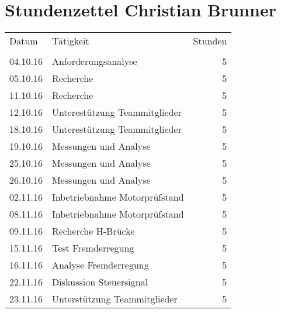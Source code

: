 \chapter{Stundenzettel Christian Brunner}
\begin{minipage}{0.5\textwidth}
    \begin{tabular}{lp{4.5cm}r}
		Datum		&	Tätigkeit				&Stunden	\\
					&							&			\\
		04.10.16	&	Anforderungsanalyse		&	5		\\
		05.10.16	&	Recherche				&	5		\\
		11.10.16	&	Recherche				&	5		\\
		12.10.16	&	Unterestützung \newline
						Teammitglieder			&	5		\\
		18.10.16	&	Unterestützung \newline
						Teammitglieder			&	5		\\
		19.10.16	&	Messungen und Analyse	&	5		\\
		25.10.16	&	Messungen und Analyse	&	5		\\
		26.10.16	&	Messungen und Analyse	&	5		\\
		02.11.16	&	Inbetriebnahme \newline
						Motorprüfstand			&	5		\\
		08.11.16	&	Inbetriebnahme \newline
						Motorprüfstand			&	5		\\
		09.11.16	&	Recherche H-Brücke		&	5		\\
		15.11.16	&	Test Fremderregung		&	5		\\
		16.11.16	&	Analyse Fremderregung	&	5		\\
		22.11.16	&	Diskussion Steuersignal	&	5		\\
		23.11.16	&	Unterstützung \newline
						Teammitglieder			&	5		\\
		

    \end{tabular}
\end{minipage}
\vline
